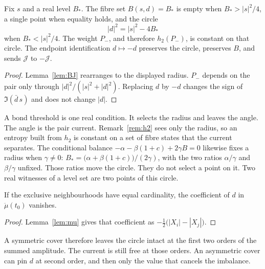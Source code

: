\begin{proposition}
\label{prop:circle}
Fix \(s\) and a real level \(B_*\).
The fibre set \(B(s,d)=B_*\) is empty when \(B_*>|s|^2/4\),
a single point when equality holds, and the circle
\[
|d|^2=|s|^2-4B_*
\]
when \(B_*<|s|^2/4\).
The weight \(P_-\), and therefore \(h_2(P_-)\), is constant on that circle.
The endpoint identification \(d\mapsto -d\) preserves the circle,
preserves \(B\), and sends \(\mathcal{J}\) to \(-\mathcal{J}\).
\end{proposition}

\begin{proof}
Lemma~\ref{lem:BJ} rearranges to the displayed radius.
\(P_-\) depends on the pair only through \(|d|^2/(|s|^2+|d|^2)\).
Replacing \(d\) by \(-d\) changes the sign of \(\Im(\bar d\, s)\) and
does not change \(|d|\).
\end{proof}

A bond threshold is one real condition.
It selects the radius and leaves the angle.
The angle is the pair current.
Remark~\ref{rem:h2} sees only the radius, so an entropy built from
\(h_2\) is constant on a set of fibre states that the current separates.
The conditional balance
\(-\alpha-\beta(1+c)+2\gamma B=0\)
likewise fixes a radius when \(\gamma\neq 0\):
\(B_*=\bigl(\alpha+\beta(1+c)\bigr)/(2\gamma)\),
with the two ratios \(\alpha/\gamma\) and \(\beta/\gamma\) unfixed.
Those ratios move the circle.
They do not select a point on it.
Two real witnesses of a level set are two points of this circle.

\begin{corollary}
\label{cor:balanced}
If the exclusive neighbourhoods have equal cardinality,
the coefficient of \(d\) in \(\ddot\mu(t_0)\) vanishes.
\end{corollary}

\begin{proof}
Lemma~\ref{lem:mu} gives that coefficient as
\(-\tfrac12\bigl(|X_i|-|X_j|\bigr)\).
\end{proof}

A symmetric cover therefore leaves the circle intact at the first two
orders of the summed amplitude.
The current is still free at those orders.
An asymmetric cover can pin \(d\) at second order, and then only the
value that cancels the imbalance.

